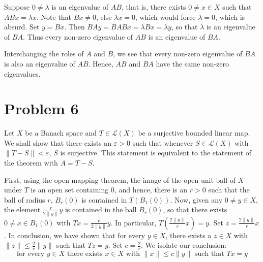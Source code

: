 \documentclass[11pt]{article}
\theoremstyle{thmstyle}
\theoremstyle{defstyle}
\renewcommand{\le}{\leqslant}
\begin{document}
Suppose $0\ne\lambda$ is an eigenvalue of $AB$, that is, there exists $0\ne x\in X$ such that $ABx = \lambda x$. Note that $Bx \ne 0$, else $\lambda x = 0$, which would force $\lambda = 0$, which is absurd. Set $y = Bx$. Then $BAy = BABx = \lambda Bx = \lambda y$, so that $\lambda$ is an eigenvalue of $BA$. Thus every non-zero eigenvalue of $AB$ is an eigenvalue of $BA$.

Interchanging the roles of $A$ and $B$, we see that every non-zero eigenvalue of $BA$ is also an eigenvalue of $AB$. Hence, $AB$ and $BA$ have the same non-zero eigenvalues.

\section{Problem 6} 

Let $X$ be a Banach space and $T\in\mathscr L(X)$ be a surjective bounded linear map. We shall show that there exists an $\varepsilon > 0$ such that whenever $S\in\mathscr L(X)$ with $\|T - S\| < \varepsilon$, $S$ is surjective. This statement is equivalent to the statement of the theorem with $A = T - S$. 

First, using the open mapping theorem, the image of the open unit ball of $X$ under $T$ is an open set containing $0$, and hence, there is an $r > 0$ such that the ball of radius $r$, $B_r(0)$ is contained in $T\left(B_1(0)\right)$. Now, given any $0\ne y\in X$, the element $\frac{r}{2\|y\|}y$ is contained in the ball $B_r(0)$, so that there exists $0\ne x\in B_1(0)$ with $Tx = \frac{r}{2\|y\|}y$. In particular, $T\left(\frac{2\|y\|}{r}x\right) = y$. Set $z = \frac{2\|y\|}{r}x$. In conclusion, we have shown that for every $y\in X$, there exists a $z\in X$ with $\|z\|\le\frac{2}{r}\|y\|$ such that $Tz = y$. Set $c = \frac{2}{r}$. We isolate our conclusion:
\begin{equation*}\label{conclusion}\tag{$\star$}
    \text{for every $y\in X$ there exists $x\in X$ with $\|x\|\le c\|y\|$ such that $Tx = y$}
\end{equation*}
\end{document}
